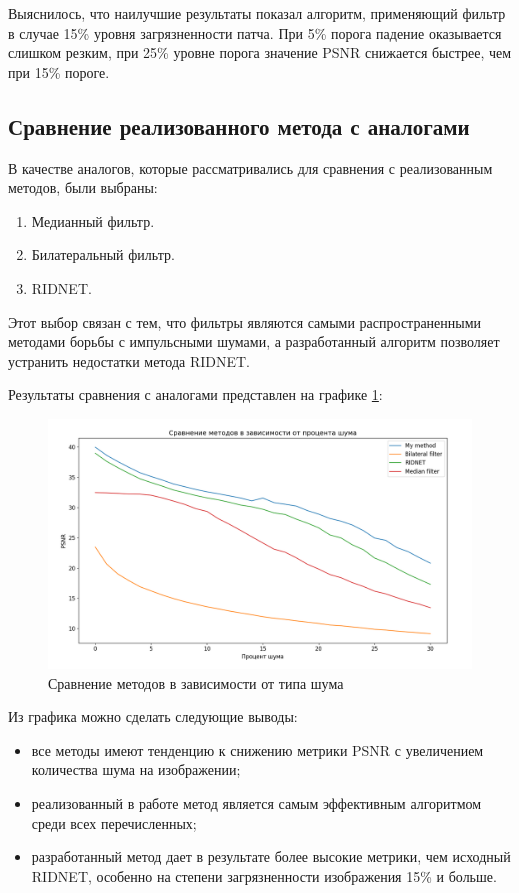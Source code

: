 Выяснилось, что наилучшие результаты показал алгоритм, применяющий фильтр в случае 15\% уровня загрязненности патча.
При 5\% порога падение оказывается слишком резким, при 25\% уровне порога значение PSNR снижается быстрее, чем при 15\% пороге.

\subsection{Сравнение реализованного метода с аналогами}
В качестве аналогов, которые рассматривались для сравнения с реализованным методов, были выбраны:
\begin{enumerate}
	\item Медианный фильтр.
	\item Билатеральный фильтр.
	\item RIDNET.
\end{enumerate}

Этот выбор связан с тем, что фильтры являются самыми распространенными методами борьбы с импульсными шумами, а разработанный алгоритм позволяет устранить недостатки метода RIDNET.

Результаты сравнения с аналогами представлен на графике \ref{res::conp}:
\FloatBarrier
\begin{figure}[h]	
	\begin{center}
		\includegraphics[width=\linewidth]{inc/png/result1.png}
	\end{center}
	\captionsetup{justification=centering}
	\caption{Сравнение методов в зависимости от типа шума}
	\label{res::conp}
\end{figure}
\FloatBarrier

Из графика можно сделать следующие выводы:
\begin{itemize}
	\item все методы имеют тенденцию к снижению метрики PSNR с увеличением количества шума на изображении;
	\item реализованный в работе метод является самым эффективным алгоритмом среди всех перечисленных;
	\item разработанный метод дает в результате более высокие метрики, чем исходный RIDNET, особенно на степени загрязненности изображения 15\% и больше.
\end{itemize}

